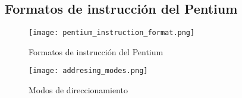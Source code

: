 \documentclass{article}
\begin{document}
\newpage
\subsection*{Formatos de instrucci\'{o}n del Pentium}

\begin{figure}[h]
    \centering
    \texttt{[image: pentium\_instruction\_format.png]}
    \caption{Formatos de instrucci\'{o}n del Pentium
    \cite{stallings2006organización}}
    \label{fig:formato-instruccion-pentium}
\end{figure}





\begin{figure}[ht]
    \centering
    \texttt{[image: addresing\_modes.png]}
    \caption{Modos de direccionamiento
        \cite{stallings2006organización}}
    \label{fig:modos-direccionamiento}
\end{figure}
\end{document}
